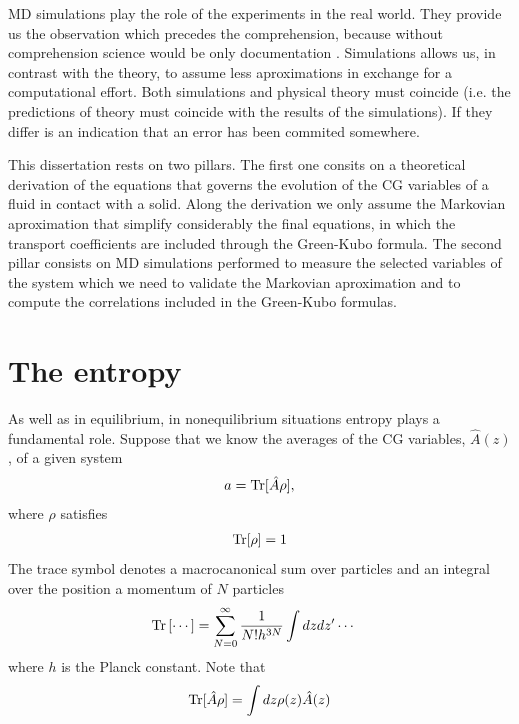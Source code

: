 \documentclass[b5paper,openright,10pt]{book}
\begin{document}
MD simulations play the role of the experiments in the real world. They provide us the observation which precedes the comprehension, because without comprehension science would be only documentation \cite{Rapaport}. Simulations allows us, in contrast with the theory, to assume less aproximations in exchange for a computational effort. Both simulations and physical theory must coincide (i.e. the predictions of theory must coincide with the results of the simulations). If they differ is an indication that an error has been commited somewhere.

This dissertation rests on two pillars. The first one consits on a theoretical derivation of the equations that governs the evolution of the CG variables of a fluid in contact with a solid. 
Along the derivation we only assume the Markovian aproximation that simplify considerably the final equations, in which the transport coefficients are included through the Green-Kubo formula. 
The second pillar consists on MD simulations performed to measure the selected variables of the system which we need to validate the Markovian aproximation and to compute the correlations included in the Green-Kubo formulas.

\section{The entropy}\label{Sec:TheEntropy}
As well as in equilibrium, in nonequilibrium situations entropy plays a fundamental role. 
Suppose that we know the averages of the CG variables, $\hat{A}(z)$, of a given system 
\begin{align}
    a = {\rm Tr}[{\hat{A}}\rho] ,
    \label{ave0}
\end{align}
where $\rho$ satisfies
\begin{align}
    {\rm Tr}[\rho] = 1
    \label{intrho}
\end{align}
The trace symbol denotes a macrocanonical sum over particles and an integral over the position a momentum of $N$ particles
\begin{align}
  {\rm Tr}\left[\cdots\right]&=\sum_{N=0}^\infty \frac{1}{N!h^{3N}}
\int dzdz'\cdots
\end{align}
where $h$ is the Planck constant. 
Note that 
\begin{align}
    {\rm Tr}[\hat{A}\rho] = \int dz\rho(z)\hat{A}(z) 
\end{align}
\end{document}
